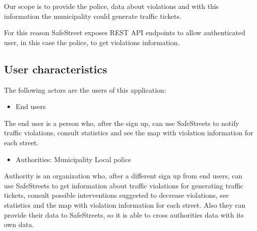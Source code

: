 Our scope is to provide the police, data about violations and with this information the municipality could generate traffic tickets.

For this reason SafeStreet exposes REST API endpoints to allow authenticated user, in this case the police, to get violations information.


\subsection{User characteristics}

The following actors are the users of this application:

\begin{itemize}
	\item End users
\end{itemize}

The end user is a person who, after the sign up, can use SafeStreets to notify traffic violations, consult statistics and see the map with violation information for each street.

\begin{itemize}
	\item Authorities:
	\subitem Municipality
	\subitem Local police
\end{itemize}


Authority is an organization who, after a different sign up from end users, can use SafeStreets to get information about traffic violations for generating traffic tickets, consult possible interventions suggested to decrease violations, see statistics and the map with violation information for each street.
Also they can provide their data to SafeStreets, so it is able to cross authorities data with its own data.






